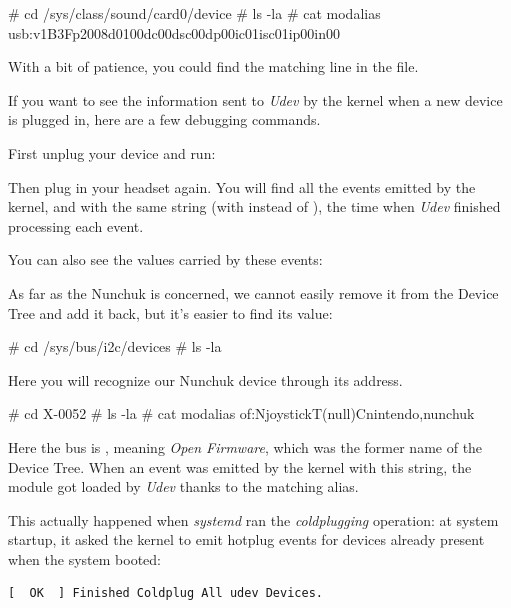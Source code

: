 \begin{bashinput}
# cd /sys/class/sound/card0/device
# ls -la
# cat modalias
usb:v1B3Fp2008d0100dc00dsc00dp00ic01isc01ip00in00
\end{bashinput}

With a bit of patience, you could find the matching line in the
 file.

If you want to see the information sent to {\em Udev} by the
kernel when a new device is plugged in, here are a few debugging
commands.

First unplug your device and run:


Then plug in your headset again. You will find all the events emitted
by the kernel, and with the same string (with  instead of
), the time when {\em Udev} finished processing each event.

You can also see the  values carried by these events:


As far as the Nunchuk is concerned, we cannot easily remove it from the
Device Tree and add it back, but it's easier to find its 
value:

\begin{bashinput}
# cd /sys/bus/i2c/devices
# ls -la
\end{bashinput}

Here you will recognize our Nunchuk device through its 
address.

\begin{bashinput}
# cd X-0052
# ls -la
# cat modalias
of:NjoystickT(null)Cnintendo,nunchuk
\end{bashinput}

Here the bus is , meaning {\em Open Firmware}, which
was the former name of the Device Tree. When an event was emitted by
the kernel with this  string, the  module
got loaded by {\em Udev} thanks to the matching alias.

This actually happened when {\em systemd} ran the {\em coldplugging}
operation: at system startup, it asked the kernel to emit hotplug events
for devices already present when the system booted:

\begin{verbatim}
[  OK  ] Finished Coldplug All udev Devices.
\end{verbatim}

